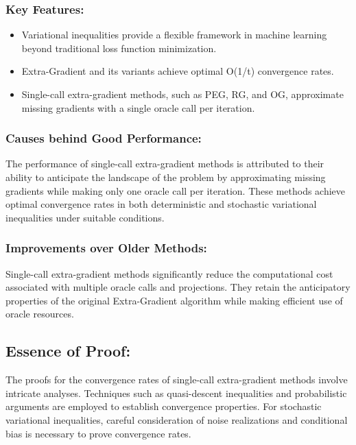 \documentclass[11pt]{article}
\begin{document}
		\subsubsection{Key Features: }
        \begin{itemize}
            \item Variational inequalities provide a flexible framework in machine learning beyond traditional loss function minimization.
            \item Extra-Gradient and its variants achieve optimal O(1/t) convergence rates.
            \item Single-call extra-gradient methods, such as PEG, RG, and OG, approximate missing gradients with a single oracle call per iteration.
        \end{itemize}
		
		\subsubsection{Causes behind Good Performance: }
  
        The performance of single-call extra-gradient methods is attributed to their ability to anticipate the landscape of the problem by approximating missing gradients while making only one oracle call per iteration. These methods achieve optimal convergence rates in both deterministic and stochastic variational inequalities under suitable conditions.
		
		\subsubsection{Improvements over Older Methods: }
  
        Single-call extra-gradient methods significantly reduce the computational cost associated with multiple oracle calls and projections. They retain the anticipatory properties of the original Extra-Gradient algorithm while making efficient use of oracle resources.
	
	\subsection{Essence of Proof: }
        
        The proofs for the convergence rates of single-call extra-gradient methods involve intricate analyses. Techniques such as quasi-descent inequalities and probabilistic arguments are employed to establish convergence properties. For stochastic variational inequalities, careful consideration of noise realizations and conditional bias is necessary to prove convergence rates.
	
\end{document}
